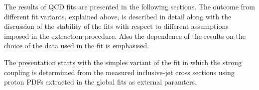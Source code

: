 The results of QCD fits are presented in the following sections. The outcome from different fit variants, explained above, is described in detail along with the discussion of the stability of the fits with respect to different assumptions imposed in the \asz extraction procedure. Also the dependence of the results on the choice of the data used in the fit is emphasised.

The presentation starts with the simples variant of the fit in which the strong coupling \asz is determimed from the measured inclusive-jet cross sections using proton PDFs extracted in the global fits as external paramters.